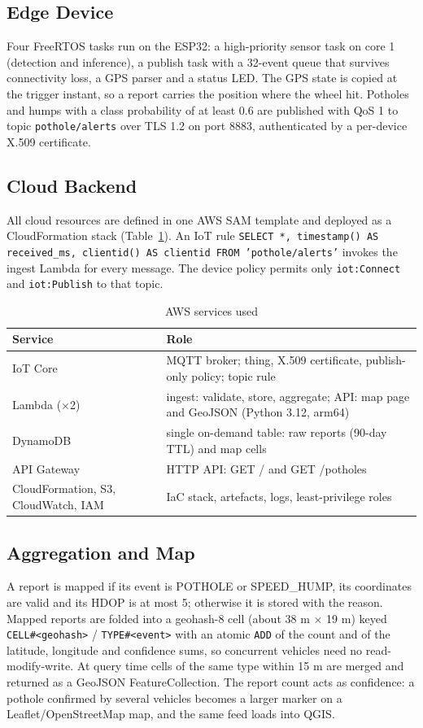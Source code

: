 \documentclass[conference]{IEEEtran}
\begin{document}
\subsection{Edge Device}
Four FreeRTOS tasks run on the ESP32: a high-priority sensor task on core 1 (detection and inference), a publish task with a 32-event queue that survives connectivity loss, a GPS parser and a status LED. The GPS state is copied at the trigger instant, so a report carries the position where the wheel hit. Potholes and humps with a class probability of at least 0.6 are published with QoS 1 to topic \texttt{pothole/alerts} over TLS 1.2 on port 8883, authenticated by a per-device X.509 certificate.

\subsection{Cloud Backend}
All cloud resources are defined in one AWS SAM template and deployed as a CloudFormation stack (Table~\ref{tab:svc}). An IoT rule \texttt{SELECT *, timestamp() AS received\_ms, clientid() AS clientid FROM 'pothole/alerts'} invokes the ingest Lambda for every message. The device policy permits only \texttt{iot:Connect} and \texttt{iot:Publish} to that topic.

\begin{table}[t]
\caption{AWS services used}
\label{tab:svc}
\centering
\footnotesize
\begin{tabular}{l p{5.4cm}}
\hline
\textbf{Service} & \textbf{Role} \\
\hline
IoT Core & MQTT broker; thing, X.509 certificate, publish-only policy; topic rule \\
Lambda ($\times$2) & ingest: validate, store, aggregate; API: map page and GeoJSON (Python 3.12, arm64) \\
DynamoDB & single on-demand table: raw reports (90-day TTL) and map cells \\
API Gateway & HTTP API: GET / and GET /potholes \\
CloudFormation, S3, CloudWatch, IAM & IaC stack, artefacts, logs, least-privilege roles \\
\hline
\end{tabular}
\end{table}

\subsection{Aggregation and Map}
A report is mapped if its event is POTHOLE or SPEED\_HUMP, its coordinates are valid and its HDOP is at most 5; otherwise it is stored with the reason. Mapped reports are folded into a geohash-8 cell (about 38 m $\times$ 19 m) keyed \texttt{CELL\#\textless{}geohash\textgreater{}} / \texttt{TYPE\#\textless{}event\textgreater{}} with an atomic \texttt{ADD} of the count and of the latitude, longitude and confidence sums, so concurrent vehicles need no read-modify-write. At query time cells of the same type within 15 m are merged and returned as a GeoJSON FeatureCollection. The report count acts as confidence: a pothole confirmed by several vehicles becomes a larger marker on a Leaflet/OpenStreetMap map, and the same feed loads into QGIS.
\end{document}
